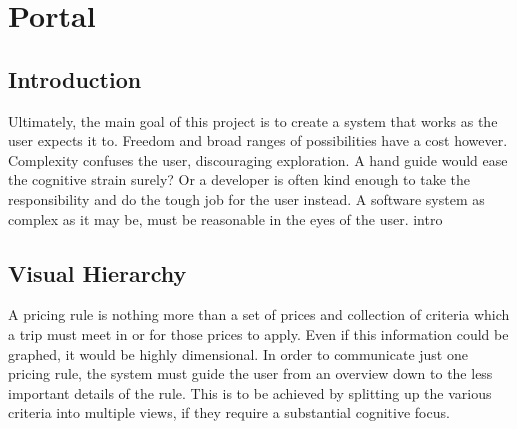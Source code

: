 \graphicspath{{Chapter5/Figs/Vector/}{Chapter5/Figs/}}

%
\chapter{Portal}

%
\section{Introduction}
Ultimately, the main goal of this project is to create a system that works as the user expects it to. Freedom and broad ranges of possibilities have a cost however. Complexity confuses the user, discouraging exploration. A hand guide would ease the cognitive strain surely? Or a developer is often kind enough to take the responsibility and do the tough job for the user instead. A software system as complex as it may be, must be reasonable in the eyes of the user.
intro

%
%
\section{Visual Hierarchy}
A pricing rule is nothing more than a set of prices and collection of criteria which a trip must meet in or for those prices to apply. Even if this information could be graphed, it would be highly dimensional. In order to communicate just one pricing rule, the system must guide the user from an overview down to the less important details of the rule. This is to be achieved by splitting up the various criteria into multiple views, if they require a substantial cognitive focus.

